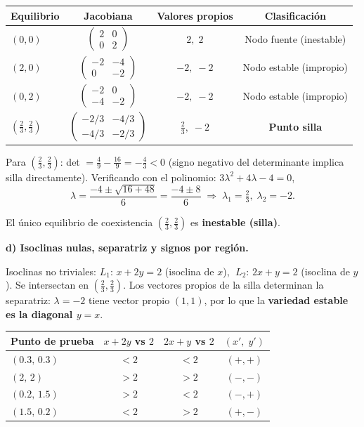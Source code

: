 \documentclass[12pt,letterpaper]{article}
\begin{document}
\begin{table}[H]
\centering
\begin{tabular}{lccc}
\toprule
Equilibrio & Jacobiana & Valores propios & Clasificación \\
\midrule
$(0,0)$ & $\begin{pmatrix}2&0\\0&2\end{pmatrix}$ & $2,\;2$ & Nodo fuente (inestable) \\[8pt]
$(2,0)$ & $\begin{pmatrix}-2&-4\\0&-2\end{pmatrix}$ & $-2,\;-2$ & Nodo estable (impropio) \\[8pt]
$(0,2)$ & $\begin{pmatrix}-2&0\\-4&-2\end{pmatrix}$ & $-2,\;-2$ & Nodo estable (impropio) \\[8pt]
$\left(\frac{2}{3},\frac{2}{3}\right)$ &
  $\begin{pmatrix}-2/3&-4/3\\-4/3&-2/3\end{pmatrix}$ & $\frac{2}{3},\;-2$ & \textbf{Punto silla} \\
\bottomrule
\end{tabular}
\end{table}

Para $\left(\tfrac23,\tfrac23\right)$: det $=\tfrac49-\tfrac{16}{9}=-\tfrac43<0$ (signo negativo
del determinante implica silla directamente). Verificando con el polinomio: $3\lambda^2+4\lambda-4=0$,
\[
  \lambda = \frac{-4\pm\sqrt{16+48}}{6} = \frac{-4\pm 8}{6}
  \;\Rightarrow\; \lambda_1=\tfrac{2}{3},\;\lambda_2=-2.
\]

El único equilibrio de coexistencia $\left(\tfrac23,\tfrac23\right)$ es \textbf{inestable (silla)}.

\bigskip
\noindent\textbf{d) Isoclinas nulas, separatriz y signos por región.}

Isoclinas no triviales: $L_1:\,x+2y=2$ (isoclina de $x$), $\;L_2:\,2x+y=2$ (isoclina de $y$).
Se intersectan en $\left(\tfrac23,\tfrac23\right)$. Los vectores propios de la silla determinan la
separatriz: $\lambda=-2$ tiene vector propio $(1,1)$, por lo que la \textbf{variedad estable es la diagonal $y=x$}.

\begin{table}[H]
\centering
\begin{tabular}{lccc}
\toprule
Punto de prueba & $x+2y$ vs $2$ & $2x+y$ vs $2$ & $(x',\;y')$ \\
\midrule
$(0.3,\,0.3)$ & $<2$ & $<2$ & $(+,+)$ \\
$(2,\,2)$ & $>2$ & $>2$ & $(-,-)$ \\
$(0.2,\,1.5)$ & $>2$ & $<2$ & $(-,+)$ \\
$(1.5,\,0.2)$ & $<2$ & $>2$ & $(+,-)$ \\
\bottomrule
\end{tabular}
\end{table}
\end{document}
